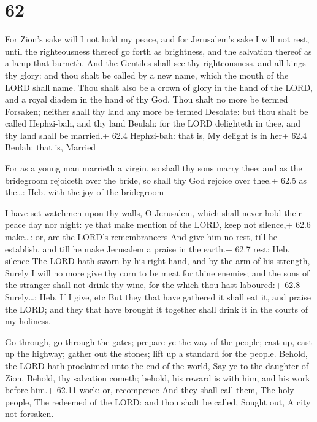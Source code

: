 \hypertarget{section-61}{%
\section{62}\label{section-61}}

 For Zion's sake will I not hold my peace, and for
Jerusalem's sake I will not rest, until the righteousness thereof go
forth as brightness, and the salvation thereof as a lamp that burneth.
 And the Gentiles shall see thy righteousness, and all kings
thy glory: and thou shalt be called by a new name, which the mouth of
the LORD shall name.  Thou shalt also be a crown of glory in
the hand of the LORD, and a royal diadem in the hand of thy God.
 Thou shalt no more be termed Forsaken; neither shall thy
land any more be termed Desolate: but thou shalt be called Hephzi-bah,
and thy land Beulah: for the LORD delighteth in thee, and thy land shall
be married.+ 62.4 Hephzi-bah: that is, My delight is in her+ 62.4
Beulah: that is, Married

 For as a young man marrieth a virgin, so shall thy sons
marry thee: and as the bridegroom rejoiceth over the bride, so shall thy
God rejoice over thee.+ 62.5 as the\ldots: Heb. with the joy of the
bridegroom

 I have set watchmen upon thy walls, O Jerusalem, which
shall never hold their peace day nor night: ye that make mention of the
LORD, keep not silence,+ 62.6 make\ldots: or, are the LORD's
remembrancers  And give him no rest, till he establish, and
till he make Jerusalem a praise in the earth.+ 62.7 rest: Heb. silence
 The LORD hath sworn by his right hand, and by the arm of
his strength, Surely I will no more give thy corn to be meat for thine
enemies; and the sons of the stranger shall not drink thy wine, for the
which thou hast laboured:+ 62.8 Surely\ldots: Heb. If I give, etc
 But they that have gathered it shall eat it, and praise the
LORD; and they that have brought it together shall drink it in the
courts of my holiness.

 Go through, go through the gates; prepare ye the way of
the people; cast up, cast up the highway; gather out the stones; lift up
a standard for the people.  Behold, the LORD hath
proclaimed unto the end of the world, Say ye to the daughter of Zion,
Behold, thy salvation cometh; behold, his reward is with him, and his
work before him.+ 62.11 work: or, recompence  And they
shall call them, The holy people, The redeemed of the LORD: and thou
shalt be called, Sought out, A city not forsaken.

